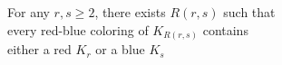 \documentclass[preview]{standalone}
\begin{document}
\begin{center}
For any $r, s \geq 2$, there exists $R(r,s)$ such that\\every red-blue coloring of $K_{R(r,s)}$ contains\\either a red $K_r$ or a blue $K_s$
\end{center}
\end{document}
